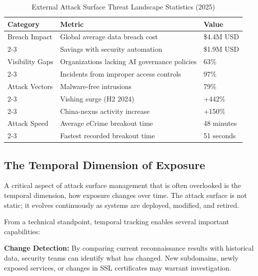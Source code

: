 \documentclass[a4paper,12pt]{report}
\begin{document}

\begin{table}[H]
\centering
\caption{External Attack Surface Threat Landscape Statistics (2025)}
\label{tab:threat-statistics}
\renewcommand{\arraystretch}{1.4}
\begin{tabular}{|p{4cm}|p{6cm}|p{3cm}|}
\hline
\textbf{Category} & \textbf{Metric} & \textbf{Value} \\
\hline
\multirow{}{}{Breach Impact} 
    & Global average data breach cost & \$4.4M USD \\
\cline{2-3}
    & Savings with security automation & \$1.9M USD \\
\hline
\multirow{}{}{Visibility Gaps} 
    & Organizations lacking AI governance policies & 63\% \\
\cline{2-3}
    & Incidents from improper access controls & 97\% \\
\hline
\multirow{}{}{Attack Vectors} 
    & Malware-free intrusions & 79\% \\
\cline{2-3}
    & Vishing surge (H2 2024) & +442\% \\
\cline{2-3}
    & China-nexus activity increase & +150\% \\
\hline
\multirow{}{}{Attack Speed} 
    & Average eCrime breakout time & 48 minutes \\
\cline{2-3}
    & Fastest recorded breakout time & 51 seconds \\
\hline
\end{tabular}
\vspace{0.5em}
\end{table}


\subsection{The Temporal Dimension of Exposure}

A critical aspect of attack surface management that is often overlooked is the temporal dimension, how exposure changes over time. The attack surface is not static; it evolves continuously as systems are deployed, modified, and retired.\hfill \break

From a technical standpoint, temporal tracking enables several important capabilities:\hfill \break

\textbf{Change Detection:} By comparing current reconnaissance results with historical data, security teams can identify what has changed. New subdomains, newly exposed services, or changes in SSL certificates may warrant investigation.\hfill \break
\end{document}
